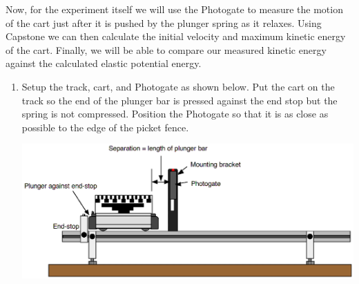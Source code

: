 \documentclass[main.tex]{subfiles}
\begin{document}
Now, for the experiment itself we will use the Photogate to measure the motion of the cart just after it is pushed by the plunger spring as it relaxes. Using Capstone we can then calculate the initial velocity and maximum kinetic energy of the cart. Finally, we will be able to compare our measured kinetic energy against the calculated elastic potential energy.
\begin{enumerate}
\item
Setup the track, cart, and Photogate as shown below. Put the cart on the track so the end of the plunger bar is pressed against the end stop but the spring is not compressed. Position the Photogate so that it is as close as possible to the edge of the picket fence.

\includegraphics[width=\textwidth]{Energy_2_Experiment_Setup}


\end{enumerate}
\end{document}
